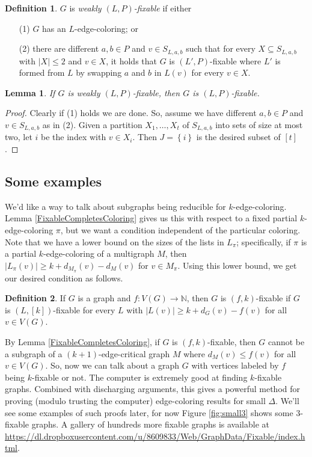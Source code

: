 \documentclass[12pt]{article}
\theoremstyle{plain}
\newtheorem{lem}[thm]{Lemma}
\theoremstyle{definition}
\newtheorem{defn}{Definition}
\theoremstyle{remark}
\newcommand{\IN}{\mathbb{N}}
\newcommand{\set}[1]{\left\{ #1 \right\}}
\newcommand{\func}[3]{#1\colon #2 \rightarrow #3}
\newcommand{\irange}[1]{\left[#1\right]}
\begin{document}
\begin{defn}
$G$ is \emph{weakly $(L, P)$-fixable} if either
\begin{enumerate}
\item[(1)] $G$ has an $L$-edge-coloring; or
\item[(2)] there are different $a,b \in P$ and $v \in S_{L,a,b}$ such that for every $X \subseteq S_{L,a,b}$ with $|X| \le 2$ and $v \in X$, it holds that $G$ is $(L', P)$-fixable where $L'$ is formed from $L$ by swapping $a$ and $b$ in $L(v)$ for every $v \in X$.
\end{enumerate}
\end{defn}

\begin{lem}\label{weaklyfixable}
If $G$ is weakly $(L, P)$-fixable, then $G$ is $(L, P)$-fixable.
\end{lem}
\begin{proof}
Clearly if (1) holds we are done.  So, assume we have different $a,b \in P$ and $v \in S_{L,a,b}$ as in (2). Given a partition $X_1, \ldots, X_t$ of $S_{L,a,b}$ into sets of size at most two, let $i$ be the index with $v \in X_i$.  Then $J = \set{i}$ is the desired subset of $\irange{t}$.
\end{proof}

\subsection{Some examples}
We'd like a way to talk about subgraphs being reducible for $k$-edge-coloring.  Lemma \ref{FixableCompletesColoring} gives us this with respect to a fixed partial $k$-edge-coloring $\pi$, but we want a condition independent of the particular coloring.  
Note that we have a lower bound on the sizes of the lists in $L_\pi$; specifically, if $\pi$ is a partial $k$-edge-coloring of a multigraph $M$, then $|L_{\pi}(v)| \ge k + d_{M_\pi}(v) - d_M(v)$ for $v \in M_{\pi}$. Using this lower bound, we get our desired condition as follows.

\begin{defn}
If $G$ is a graph and $\func{f}{V(G)}{\IN}$, then $G$ is $(f,k)$-fixable if $G$ is $(L, \irange{k})$-fixable for every $L$ with $|L(v)| \ge k + d_{G}(v) - f(v)$ for all $v \in V(G)$.
\end{defn}

By Lemma \ref{FixableCompletesColoring}, if $G$ is $(f,k)$-fixable, then $G$ cannot be a subgraph of a $(k+1)$-edge-critical graph $M$ where $d_M(v) \le f(v)$ for all $v \in V(G)$.  
So, now we can talk about a graph $G$ with vertices labeled by $f$ being $k$-fixable or not.  The computer is extremely good at finding $k$-fixable graphs.  Combined with discharging arguments, this gives a powerful method for proving (modulo trusting the computer) edge-coloring results for small $\Delta$.  We'll see some examples of such proofs later, for now Figure \ref{fig:small3} shows some $3$-fixable graphs.  A gallery of hundreds more fixable graphs is available at \url{https://dl.dropboxusercontent.com/u/8609833/Web/GraphData/Fixable/index.html}.
\end{document}
